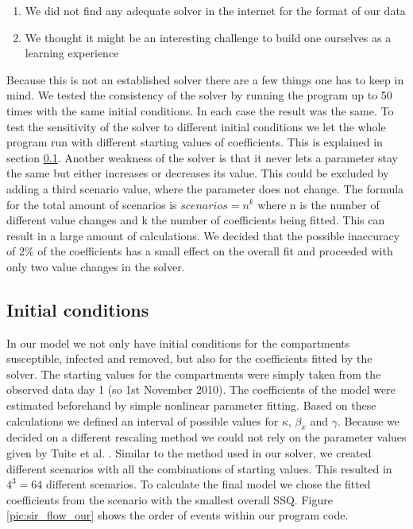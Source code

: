 \documentclass[11pt]{article}
\begin{document}
\begin{enumerate}
\item We did not find any adequate solver in the internet for the format of our data
\item We thought it might be an interesting challenge to build one ourselves as a learning experience
\end{enumerate}

Because this is not an established solver there are a few things one has to keep in mind. We tested the consistency of the solver by running the program up to 50 times with the same initial conditions. In each case the result was the same. To test the sensitivity of the solver to different initial conditions we let the whole program run with different starting values of coefficients. This is explained in section \ref{sec:initial conditions}. Another weakness of the solver is that it never lets a parameter stay the same but either increases or decreases its value. This could be excluded by adding a third scenario value, where the parameter does not change. The formula for the total amount of scenarios is $scenarios=n^{k}$ where n is the number of different value changes and k the number of coefficients being fitted. This can result in a large amount of calculations. We decided that the possible inaccuracy of 2\% of the coefficients has a small effect on the overall fit and proceeded with only two value changes in the solver.



\subsection{Initial conditions}
\label{sec:initial conditions}
In our model we not only have initial conditions for the compartments susceptible, infected and removed, but also for the coefficients fitted by the solver. The starting values for the compartments were simply taken from the observed data day 1 (so 1st November 2010). The coefficients of the model were estimated beforehand by simple nonlinear parameter fitting. Based on these calculations we defined an interval of possible values for $\kappa$, $\beta_{x}$ and $\gamma$. Because we decided on a different rescaling method we could not rely on the parameter values given by Tuite et al. \cite{tuite:2011}. Similar to the method used in our solver, we created different scenarios with all the combinations of starting values. This resulted in $4^{3}=64$ different scenarios. To calculate the final model we chose the fitted coefficients from the scenario with the smallest overall SSQ. Figure \ref{pic:sir_flow_our} shows the order of events within our program code.
\end{document}
